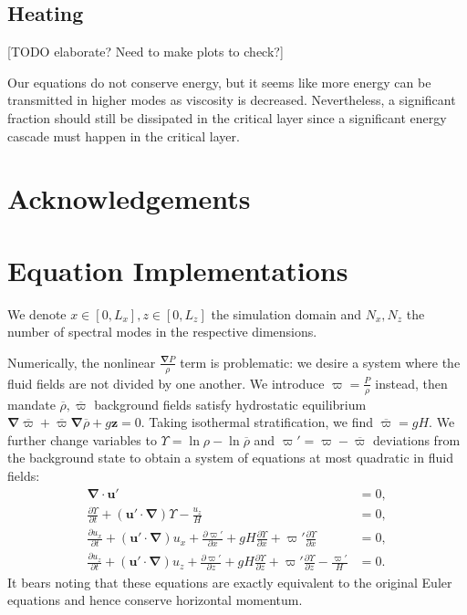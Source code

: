 \documentclass[
        fleqn,
        usenatbib,
    ]{mnras}
\newcommand*{\pd}[2]{\frac{\partial#1}{\partial#2}}
\newcommand*{\p}[1]{\left(#1\right)}
\newcommand*{\bm}[1]{\boldsymbol{\mathbf{#1}}}
\begin{document}
\subsection{Heating}

[TODO elaborate? Need to make plots to check?]

Our equations do not conserve energy, but it seems like more energy can be
transmitted in higher modes as viscosity is decreased. Nevertheless, a
significant fraction should still be dissipated in the critical layer since a
significant energy cascade must happen in the critical layer.

\section{Acknowledgements}\label{s:ack}




\clearpage
\onecolumn
\appendix

\section{Equation Implementations}\label{se:strat_impl}

We denote $x \in [0, L_x], z \in [0, L_z]$ the simulation domain and $N_x, N_z$
the number of spectral modes in the respective dimensions.

Numerically, the nonlinear $\frac{\bm{\nabla}P}{\rho}$ term is problematic: we
desire a system where the fluid fields are not divided by one another. We
introduce $\varpi = \frac{P}{\rho}$ instead, then mandate $\overline{\rho},
\overline{\varpi}$ background fields satisfy hydrostatic equilibrium
$\bm{\nabla}\overline{\varpi} + \overline{\varpi} \bm{\nabla}\overline{\rho} +
g\bm{z} = 0$. Taking isothermal stratification, we find $\overline{\varpi} = gH$. We
further change variables to $\Upsilon = \ln \rho - \ln \overline{\rho}$ and
$\varpi' = \varpi - \overline{\varpi}$ deviations from the background state to obtain a
system of equations at most quadratic in fluid fields:
\begin{subequations}\label{se:nl_var}
    \begin{align}
        \bm{\nabla} \cdot \bm{u}' &= 0,\\
        \pd{\Upsilon}{t} + \p{\bm{u}' \cdot \bm{\nabla}} \Upsilon
            - \frac{u_z}{H} &= 0,\\
        \pd{u_{x}}{t} + \p{\bm{u}' \cdot \bm{\nabla}}u_{x}
            + \pd{\varpi'}{x} + gH\pd{\Upsilon}{x}
            + \varpi' \pd{\Upsilon}{x} &= 0,\\
        \pd{u_z}{t} + \p{\bm{u}' \cdot \bm{\nabla}}u_z
            + \pd{\varpi'}{z} + gH\pd{\Upsilon}{z}
            + \varpi' \pd{\Upsilon}{z} - \frac{\varpi'}{H} &= 0.
    \end{align}
\end{subequations}
It bears noting that these equations are exactly equivalent to the original
Euler equations and hence conserve horizontal momentum.
\end{document}
